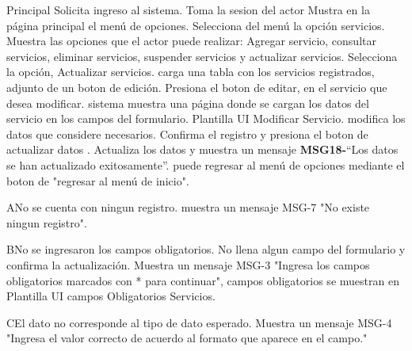 	\begin{UCtrayectoria}{Principal}
		\UCpaso Solicita ingreso al sistema.
		\UCpaso Toma la sesion del actor
		\UCpaso Mustra en la página principal el menú de opciones.
		\UCpaso[\UCactor] Selecciona del menú la opción servicios.
		\UCpaso Muestra las opciones que el actor puede realizar: Agregar servicio, consultar servicios, eliminar servicios, suspender servicios y actualizar servicios.
		\UCpaso[\UCactor] Selecciona la opción, Actualizar servicios. 
		\UCpaso carga una tabla con los servicios registrados, adjunto de un boton de edición.
		\UCpaso[\UCactor] Presiona el boton de editar, en el servicio que desea modificar.
		\UCpaso sistema muestra una página donde se cargan los datos del servicio en los campos del formulario. Plantilla UI Modificar Servicio.
		\UCpaso[\UCactor] modifica los datos que considere necesarios.
		\UCpaso[\UCactor] Confirma el registro y presiona el boton de actualizar datos   .
		\UCpaso Actualiza los datos y muestra un mensaje {\bf MSG18-}``Los datos se han actualizado exitosamente''.
		\UCpaso[\UCactor] puede regresar al menú de opciones mediante el boton de "regresar al menú de inicio".
	\end{UCtrayectoria}

		\begin{UCtrayectoriaA}{A}{No se cuenta con ningun registro.}
		\UCpaso muestra un mensaje MSG-7 "No existe ningun registro".
		\end{UCtrayectoriaA}

		\begin{UCtrayectoriaA}{B}{No se ingresaron los campos obligatorios.}
			\UCpaso[\UCactor] No llena algun campo del formulario y confirma la actualización.
			\UCpaso Muestra un mensaje MSG-3 "Ingresa los campos obligatorios marcados con * para continuar", campos obligatorios se muestran en Plantilla UI campos Obligatorios Servicios.
		\end{UCtrayectoriaA}

		\begin{UCtrayectoriaA}{C}{El dato no corresponde al tipo de dato esperado.}
			\UCpaso Muestra un mensaje MSG-4 "Ingresa el valor correcto de acuerdo al formato que aparece en el campo."
		\end{UCtrayectoriaA}
	
